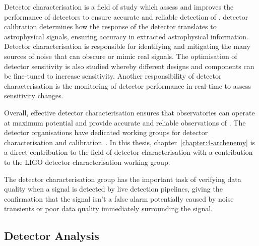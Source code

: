 Detector characterisation is a field of study which assess and improves the performance of \gwadj detectors to ensure accurate and reliable detection of \gws. \Gwadj detector calibration determines how the response of the detector translates to astrophysical signals, ensuring accuracy in extracted astrophysical information. Detector characterisation is responsible for identifying and mitigating the many sources of noise that can obscure or mimic real signals. The optimisation of detector sensitivity is also studied whereby different designs and components can be fine-tuned to increase sensitivity. Another responsibility of detector characterisation is the monitoring of detector performance in real-time to assess sensitivity changes.

Overall, effective detector characterisation ensures that \gwadj observatories can operate at maximum potential and provide accurate and reliable observations of \gws. The \gwadj detector organisations have dedicated working groups for detector characterisation and calibration~\cite{O2O3_DetChar:2021, VirgoDetChar:2023}. In this thesis, chapter~\ref{chapter:4-archenemy} is a direct contribution to the field of detector characterisation with a contribution to the LIGO detector characterisation working group.

The detector characterisation group has the important task of verifying data quality when a \gwadj signal is detected by live detection pipelines, giving the confirmation that the \gwadj signal isn't a false alarm potentially caused by noise transients or poor data quality immediately surrounding the \gwadj signal.

\subsection{\label{3:sec:detector-analysis}Detector Analysis}


